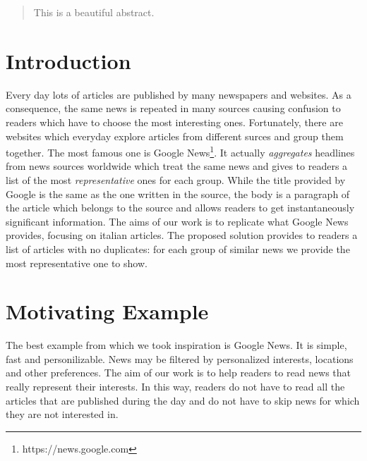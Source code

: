 \documentclass{acm_proc_article-sp}
\begin{document}
\maketitle
\begin{abstract}
\vspace{2mm}
This is a beautiful abstract.
\end{abstract}

\section{Introduction}
\vspace{2mm}
Every day lots of articles are published by many newspapers and websites. As a consequence, the same news is repeated in many sources causing confusion to readers which have to choose the most interesting ones. Fortunately, there are websites which everyday explore articles from different surces and group them together. The most famous one is Google News\footnote{https://news.google.com}. It actually \textit{aggregates} headlines from news sources worldwide which treat the same news and gives to readers a list of the most \textit{representative} ones for each group. While the title provided by Google is the same as the one written in the source, the body is a paragraph of the article which belongs to the source and allows readers to get instantaneously significant information. The aims of our work is to replicate what Google News provides, focusing on italian articles. The proposed solution provides to readers a list of articles with no duplicates: for each group of similar news we provide the most representative one to show.

\section{Motivating Example}
\vspace{2mm}
The best example from which we took inspiration is Google News. It is simple, fast and personilizable. News may be filtered by personalized interests, locations and other preferences. The aim of our work is to help readers to read news that really represent their interests. In this way, readers do not have to read all the articles that are published during the day and do not have to skip news for which they are not interested in.

\end{document}
